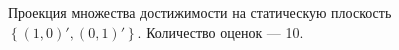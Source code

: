 \documentclass[10pt, a4paper]{article}
\begin{document}
\begin{figure}[H]
\caption{Проекция множества достижимости на статическую плоскость $\left\{(1,0)',(0,1)'\right\}$. Количество оценок --- 10.}
\end{figure}
\end{document}
